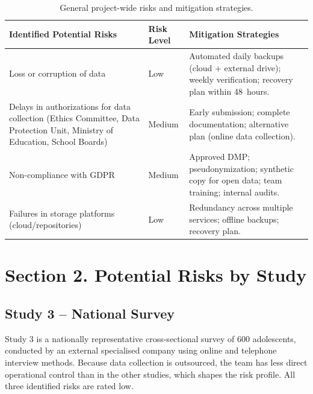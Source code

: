 \vspace{0.5cm}

\begin{table}[h!]
\centering
\caption{General project-wide risks and mitigation strategies.}
\begin{tabular}{|P{5.2cm}|P{2.0cm}|P{7.1cm}|}
\hline
{}
\textbf{Identified Potential Risks} & \textbf{Risk Level} & \textbf{Mitigation Strategies} \\
\hline
Loss or corruption of data
  & Low
  & Automated daily backups (cloud + external drive); weekly verification; recovery plan within 48~hours. \\
\hline
Delays in authorizations for data collection (Ethics Committee, Data Protection Unit, Ministry of Education, School Boards)
  & Medium
  & Early submission; complete documentation; alternative plan (online data collection). \\
\hline
Non-compliance with GDPR
  & Medium
  & Approved DMP; pseudonymization; synthetic copy for open data; team training; internal audits. \\
\hline
Failures in storage platforms (cloud/repositories)
  & Low
  & Redundancy across multiple services; offline backups; recovery plan. \\
\hline
\end{tabular}
\end{table}

\section*{Section 2. Potential Risks by Study}

\subsection*{Study 3 -- National Survey}

Study 3 is a nationally representative cross-sectional survey of 600 adolescents, conducted by an external specialised company using online and telephone interview methods. Because data collection is outsourced, the team has less direct operational control than in the other studies, which shapes the risk profile. All three identified risks are rated low.

